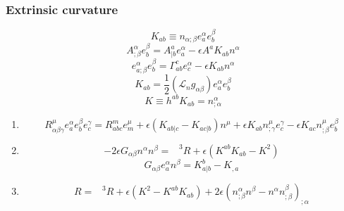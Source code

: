 \subsubsection{Extrinsic curvature}
\[K_{ab} \equiv n_{\alpha;\beta}e_a^{\alpha} e_b^{\beta}\]
\[A^{\alpha}_{;\beta} e_b^{\beta} = A^a_{|b} e_a^{\alpha} - \epsilon A^a K_{ab}n^{\alpha}\]
\[e^{\alpha}_{a;\beta} e_b^{\beta} = \Gamma^c_{ab}e_c^{\alpha} - \epsilon K_{ab}n^{\alpha}\]
\[K_{ab} = \frac{1}{2}(\mathcal{L}_n g_{\alpha \beta})e_a^{\alpha} e_b^{\beta}\]
\[K \equiv h^{ab}K_{ab} = n^{\alpha}_{;\alpha}\]

\begin{newthem}
\begin{enumerate}
\item \[R^{\mu}_{\alpha \beta \gamma} e_a^{\alpha} e_b^{\beta} e_c^{\gamma} = R^m_{abc} e_m^{\mu} + \epsilon (K_{ab|c} - K_{ac|b})n^{\mu} + \epsilon K_{ab} n^{\mu}_{;\gamma}e_c^{\gamma} - \epsilon K_{ac} n^{\mu}_{;\beta}e_b^{\beta}\]
\item \[-2\epsilon G_{\alpha \beta} n^{\alpha} n^{\beta} = \phantom{R}^3R + \epsilon(K^{ab}K_{ab}-K^2)\]
\[G_{\alpha \beta} e_a^{\alpha}n^{\beta} = K^b_{a|b} - K_{,a}\]
\item \[R = \phantom{R}^3R + \epsilon(K^2-K^{ab}K_{ab}) + 2\epsilon(n^{\alpha}_{;\beta}n^{\beta}-n^{\alpha}n^{\beta}_{;\beta})_{;\alpha}\]
\end{enumerate}
\end{newthem}

